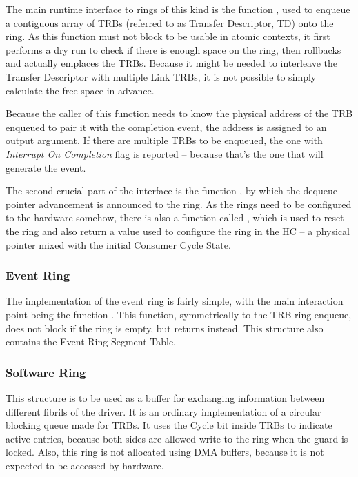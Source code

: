 The main runtime interface to rings of this kind is the function
, used to enqueue a contiguous array of
TRBs (referred to as Transfer Descriptor, TD) onto the ring. As this function
must not block to be usable in atomic contexts, it first performs a dry run to
check if there is enough space on the ring, then rollbacks and actually
emplaces the TRBs. Because it might be needed to interleave the Transfer
Descriptor with multiple Link TRBs, it is not possible to simply calculate the
free space in advance.

Because the caller of this function needs to know the physical address of the
TRB enqueued to pair it with the completion event, the address is assigned to
an output argument. If there are multiple TRBs to be enqueued, the one with
\emph{Interrupt On Completion} flag is reported -- because that's the one that
will generate the event.

The second crucial part of the interface is the function
, by which the dequeue pointer advancement is
announced to the ring. As the rings need to be configured to the hardware
somehow, there is also a function called
, which is used to reset the ring and
also return a value used to configure the ring in the HC -- a physical pointer
mixed with the initial Consumer Cycle State.

\subsubsection{Event Ring}

The implementation of the event ring is fairly simple, with the main
interaction point being the function . This
function, symmetrically to the TRB ring enqueue, does not block if the ring is
empty, but returns  instead. This structure also contains the
Event Ring Segment Table.

\subsubsection{Software Ring}
\label{sec:sw-rings}

This structure is to be used as a buffer for exchanging information between
different fibrils of the driver. It is an ordinary implementation of a circular
blocking queue made for TRBs. It uses the Cycle bit inside TRBs to indicate
active entries, because both sides are allowed write to the ring when the guard
is locked. Also, this ring is not allocated using DMA buffers, because it is
not expected to be accessed by hardware.
